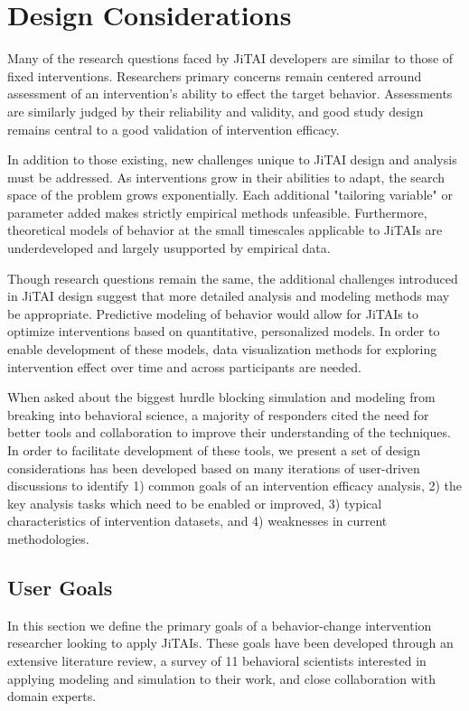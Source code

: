 \section{Design Considerations}
Many of the research questions faced by JiTAI developers are similar to those of fixed interventions. 
Researchers primary concerns remain centered arround assessment of an intervention's ability to effect the target behavior.
Assessments are similarly judged by their reliability and validity, and good study design remains central to a good validation of intervention efficacy.

In addition to those existing, new challenges unique to JiTAI design and analysis must be addressed.
As interventions grow in their abilities to adapt, the search space of the problem grows exponentially.
Each additional "tailoring variable" or parameter added makes strictly empirical methods unfeasible.
Furthermore, theoretical models of behavior at the small timescales applicable to JiTAIs are underdeveloped and largely usupported by empirical data. 

Though research questions remain the same, the additional challenges introduced in JiTAI design suggest that more detailed analysis and modeling methods may be appropriate.
Predictive modeling of behavior would allow for JiTAIs to optimize interventions based on quantitative, personalized models.
In order to enable development of these models, data visualization methods for exploring intervention effect over time and across participants are needed. 

When asked about the biggest hurdle blocking simulation and modeling from breaking into behavioral science, a majority of responders cited the need for better tools and collaboration to improve their understanding of the techniques.
In order to facilitate development of these tools, we present a set of design considerations has been developed based on many iterations of user-driven discussions to identify 1) common goals of an intervention efficacy analysis, 2) the key analysis tasks which need to be enabled or improved, 3) typical characteristics of intervention datasets, and 4) weaknesses in current methodologies. 

\subsection{User Goals}
In this section we define the primary goals of a behavior-change intervention researcher looking to apply JiTAIs.
These goals have been developed through an extensive literature review, a survey of 11 behavioral scientists interested in applying modeling and simulation to their work, and close collaboration with domain experts.

